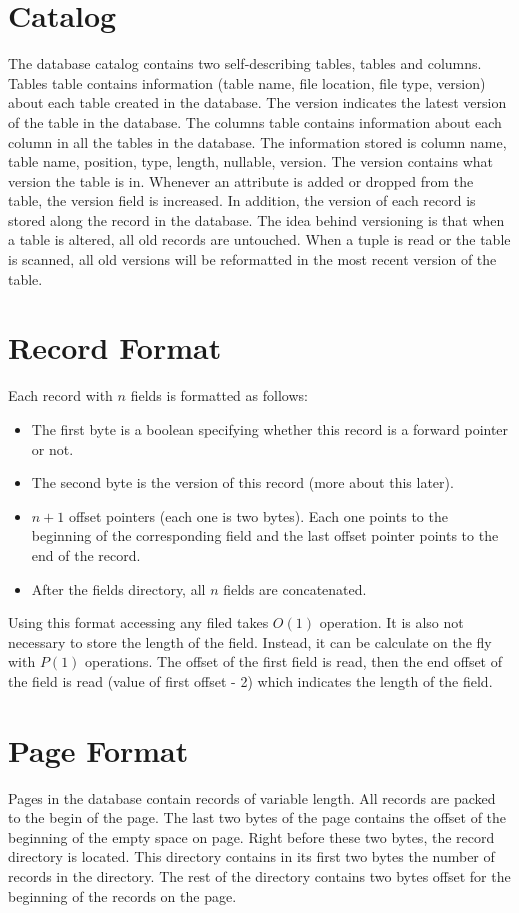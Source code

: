 \documentclass[a4paper,12pt]{article}
\begin{document}
\section{Catalog}
The database catalog contains two self-describing tables, tables and columns. Tables table contains information (table name, file location, file type, version) about each table created in the database. The version indicates the latest version of the table in the database. The columns table contains information about each column in all the tables in the database. The information stored is column name, table name, position, type, length, nullable, version. The version contains what version the table is in. Whenever an attribute is added or dropped from the table, the version field is increased. In addition, the version of each record is stored along the record in the database. The idea behind versioning is that when a table is altered, all old records are untouched. When a tuple is read or the table is scanned, all old versions will be reformatted in the most recent version of the table.

\section{Record Format}
Each record with $n$ fields is formatted as follows:
\begin{itemize}
\item The first byte is a boolean specifying whether this record is a forward pointer or not.
\item The second byte is the version of this record (more about this later).
\item $n + 1$ offset pointers (each one is two bytes). Each one points to the beginning of the corresponding field and the last offset pointer points to the end of the record.
\item After the fields directory, all $n$ fields are concatenated.
\end{itemize}

Using this format accessing any filed takes $O(1)$ operation. It is also not necessary to store the length of the field. Instead, it can be calculate on the fly with $P(1)$ operations. The offset of the first field is read, then the end offset of the field is read (value of first offset - 2) which indicates the length of the field.

\section{Page Format}
Pages in the database contain records of variable length. All records are packed to the begin of the page. The last two bytes of the page contains the offset of the beginning of the empty space on page. Right before these two bytes, the record directory is located. This directory contains in its first two bytes the number of records in the directory. The rest of the directory contains two bytes offset for the beginning of the records on the page.
\end{document}
